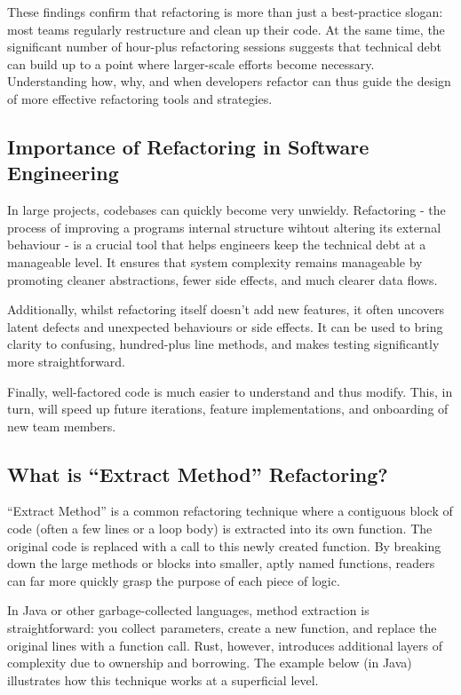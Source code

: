 These findings confirm that refactoring is more than just a best-practice
slogan: most teams regularly restructure and clean up their code. At the same
time, the significant number of hour-plus refactoring sessions suggests that
technical debt can build up to a point where larger-scale efforts become
necessary. Understanding how, why, and when developers refactor can thus guide
the design of more effective refactoring tools and strategies.

\subsection{Importance of Refactoring in Software Engineering}
\label{sec:importance-refactoring}

In large projects, codebases can quickly become very unwieldy. Refactoring - the
process of improving a programs internal structure wihtout altering its external
behaviour \cite{OneThousandOneStories-SoftwareRefactoring} - is a
crucial tool that helps engineers keep the technical debt at a manageable level.
It ensures that system complexity remains manageable by promoting cleaner
abstractions, fewer side effects, and much clearer data flows.

Additionally, whilst refactoring itself doesn't add new features, it often
uncovers latent defects and unexpected behaviours or side effects. It can be
used to bring clarity to confusing, hundred-plus line methods, and makes testing
significantly more straightforward.

Finally, well-factored code is much easier to understand and thus modify. This,
in turn, will speed up future iterations, feature implementations, and
onboarding of new team members.

\subsection{What is “Extract Method” Refactoring?}
\label{sec:extract-method}

“Extract Method” is a common refactoring technique where a contiguous block of
code (often a few lines or a loop body) is extracted into its own function. The
original code is replaced with a call to this newly created function. By
breaking down the large methods or blocks into smaller, aptly named functions,
readers can far more quickly grasp the purpose of each piece of logic.

In Java or other garbage-collected languages, method extraction is
straightforward: you collect parameters, create a new function, and replace the
original lines with a function call. Rust, however, introduces additional layers
of complexity due to ownership and borrowing. The example below (in Java)
illustrates how this technique works at a superficial level.

